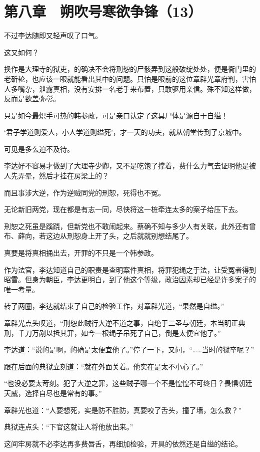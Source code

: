 \section{第八章　朔吹号寒欲争锋（13）}

不过李达随即又轻声叹了口气。

这又如何？

换作是大理寺的狱吏，的确决不会将刑恕的尸骸弄到这般破绽处处，便是衙门里的老斫轮，也应该一眼就能看出其中的问题。只怕是眼前的这位章辟光章府判，害怕人多嘴杂，泄露真相，没有安排一名老手来布置，只敢驱用亲信。殊不知这样做，反而是欲盖弥彰。

只是如今最炽手可热的韩参政，可是亲口认定了这具尸体是源自于自缢！

‘君子学道则爱人，小人学道则缢死’，才一天的功夫，就从朝堂传到了京城中。

可见是多么迫不及待。

李达好不容易才做到了大理寺少卿，又不是吃饱了撑着，费什么力气去证明他是被人先弄晕，然后才挂在房梁上的？

而且事涉大逆，作为逆贼同党的刑恕，死得也不冤。

无论新旧两党，现在都是有志一同，尽快将这一桩牵连太多的案子给压下去。

刑恕之死虽是蹊跷，但新党也不敢闹起来。蔡确不知与多少人有关联，此外还有曾布、薛向，若这边从刑恕身上开了头，之后就就别想结尾了。

真要是将真相捅出去，开罪的不只是一个韩参政。

作为法官，李达知道自己的职责是查明案件真相，将罪犯绳之于法，让受冤者得到昭雪。但身为朝臣，李达更明白，到了他这个等级，政治因素却已经是许多案子的唯一考量。

转了两圈，李达就结束了自己的检验工作，对章辟光道，“果然是自缢。”

章辟光点头叹道，“刑恕此贼行大逆不道之事，自绝于二圣与朝廷，本当明正典刑，千刀万剐以抵其罪，如今一根绳子吊死了自己，倒是太便宜他了。”

李达道：“说的是啊，的确是太便宜他了。”停了一下，又问，“……当时的狱卒呢？”

跟在后面的典狱立刻道：“就在外面关着。他实在是太不小心了。”

“也没必要太苛刻。犯了大逆之罪，这些贼子哪一个不是惶惶不可终日？畏惧朝廷天威，选择自尽也是常有的事。”

章辟光也道：“人要想死，实是防不胜防，真要咬了舌头，撞了墙，怎么救？”

典狱连点头：“下官这就让人将他放出来。”

这间牢房就不必李达再多费唇舌，再细加检验，开具的依然还是自缢的结论。

